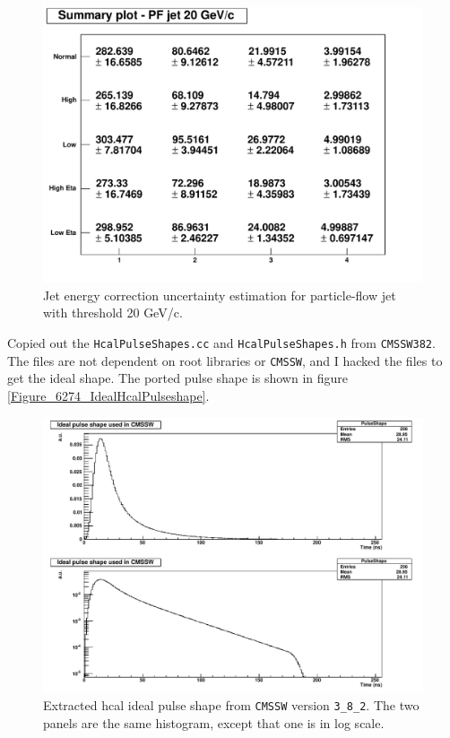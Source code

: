 \begin{figure}
\includegraphics[width=120mm]{DailyLog/6274/6274_PFJet20_JES}
\caption{Jet energy correction uncertainty estimation for particle-flow jet with threshold 20 GeV/c.}
\label{Figure_6274PFJet20_JES}
\end{figure}



Copied out the \texttt{HcalPulseShapes.cc} and \texttt{HcalPulseShapes.h} from \texttt{CMSSW382}.
The files are not dependent on root libraries or \texttt{CMSSW}, and I hacked the files to get the ideal shape.
The ported pulse shape is shown in figure \ref{Figure_6274_IdealHcalPulseshape}.

\begin{figure}
\includegraphics[width=120mm]{DailyLog/6274/6274_IdealHcalPulseshape.pdf}
\caption{Extracted hcal ideal pulse shape from \texttt{CMSSW} version \texttt{3\_8\_2}.  The two panels
are the same histogram, except that one is in log scale.}
\end{figure}

